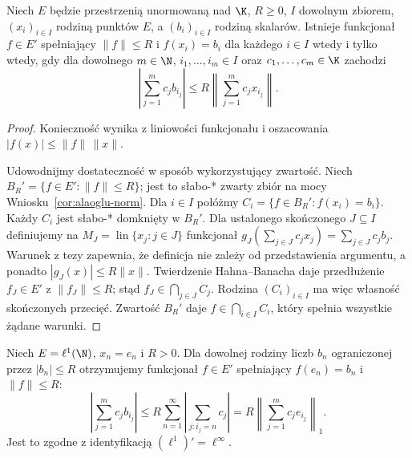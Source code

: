 \begin{twierdzenie}
\label{thm:helly-interpolation}
Niech $E$ będzie przestrzenią unormowaną nad $\K$,
$R\ge0$, $I$ dowolnym zbiorem, $(x_i)_{i\in I}$ rodziną
punktów $E$, a $(b_i)_{i\in I}$ rodziną skalarów.
Istnieje funkcjonał $f\in E'$ spełniający
$\|f\|\le R$ i $f(x_i)=b_i$ dla każdego $i\in I$
wtedy i tylko wtedy, gdy dla dowolnego $m\in\N$,
$i_1,\ldots,i_m\in I$ oraz $c_1,\ldots,c_m\in\K$
zachodzi
\[
 \left|\sum_{j=1}^{m}c_jb_{i_j}\right|
 \le R\left\|\sum_{j=1}^{m}c_jx_{i_j}\right\|.
\]
\end{twierdzenie}
\begin{proof}
Konieczność wynika z liniowości funkcjonału i oszacowania
$|f(x)|\le\|f\|\,\|x\|$.

Udowodnijmy dostateczność w sposób wykorzystujący zwartość.
Niech $B_R'=\{f\in E':\|f\|\le R\}$; jest to słabo-* zwarty
zbiór na mocy Wniosku~\ref{cor:alaoglu-norm}. Dla $i\in I$
połóżmy $C_i=\{f\in B_R':f(x_i)=b_i\}$.
Każdy $C_i$ jest słabo-* domknięty w $B_R'$.
Dla ustalonego skończonego $J\subseteq I$ definiujemy
na $M_J=\operatorname{lin}\{x_j:j\in J\}$ funkcjonał
$g_J(\sum_{j\in J}c_jx_j)=\sum_{j\in J}c_jb_j$.
Warunek z tezy zapewnia, że definicja nie zależy od
przedstawienia argumentu, a ponadto $|g_J(x)|\le R\|x\|$.
Twierdzenie Hahna--Banacha daje przedłużenie
$f_J\in E'$ z $\|f_J\|\le R$; stąd
$f_J\in\bigcap_{j\in J} C_j$.
Rodzina $(C_i)_{i\in I}$ ma więc własność skończonych przecięć.
Zwartość $B_R'$ daje $f\in\bigcap_{i\in I}C_i$,
który spełnia wszystkie żądane warunki.
\end{proof}

\begin{przyklad}
Niech $E=\ell^1(\N)$, $x_n=e_n$ i $R>0$.
Dla dowolnej rodziny liczb $b_n$ ograniczonej przez
$|b_n|\le R$ otrzymujemy funkcjonał $f\in E'$
spełniający $f(e_n)=b_n$ i $\|f\|\le R$:
\[
 \left|\sum_{j=1}^m c_jb_{i_j}\right|
 \le R\sum_{n=1}^\infty
       \left|\sum_{j:i_j=n}c_j\right|
 =R\left\|\sum_{j=1}^m c_je_{i_j}\right\|_1.
\]
Jest to zgodne z identyfikacją $(\ell^1)'=\ell^\infty$.
\end{przyklad}
